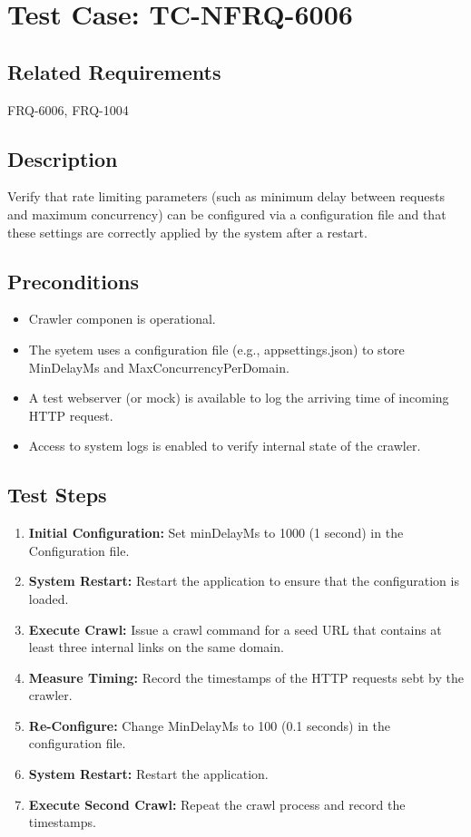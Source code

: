 \documentclass{article}
\begin{document}

\section{Test Case: TC-NFRQ-6006}

\subsection*{Related Requirements}
FRQ-6006, FRQ-1004

\subsection*{Description}
Verify that rate limiting parameters (such as minimum delay between requests and maximum concurrency) 
can be configured via a configuration file and that these settings are correctly applied by 
the system after a restart.

\subsection*{Preconditions}
\begin{itemize}
    \item Crawler componen is operational.
    \item The syetem uses a configuration file (e.g., appsettings.json) to store MinDelayMs and 
    MaxConcurrencyPerDomain.
    \item A test webserver (or mock) is available to log the arriving time of incoming HTTP request.
    \item Access to system logs is enabled to verify internal state of the crawler.
\end{itemize}

\subsection*{Test Steps}
\begin{enumerate}
    \item \textbf{Initial Configuration:} Set minDelayMs to 1000 (1 second) in the Configuration file.
    \item \textbf{System Restart:} Restart the application to ensure that the configuration is loaded.
    \item \textbf{Execute Crawl:} Issue a crawl command for a seed URL that contains at least three internal links on the same domain.
    \item \textbf{Measure Timing:} Record the timestamps of the HTTP requests sebt by the crawler.
    \item \textbf{Re-Configure:} Change MinDelayMs to 100 (0.1 seconds) in the configuration file.
    \item \textbf{System Restart:} Restart the application.
    \item \textbf{Execute Second Crawl:} Repeat the crawl process and record the timestamps.
\end{enumerate}
\end{document}
